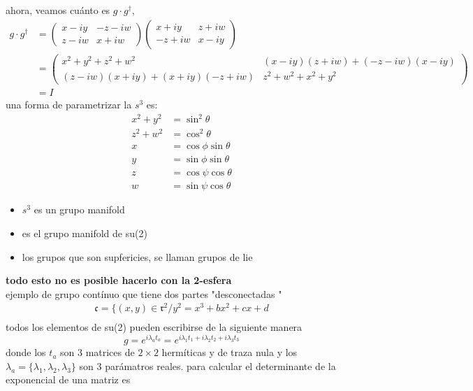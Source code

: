 \documentclass[../main.tex]{subfiles}
\begin{document}
  ahora, veamos cuánto es $g \cdot g^\dagger$, 
\begin{align*}
    g \cdot g^\dagger & = \begin{pmatrix} x-iy & -z-iw \\ z-iw & x+iw \end{pmatrix} \begin{pmatrix} x+iy & z+iw \\ -z + iw & x-iy\end{pmatrix} \\
      & = \begin{pmatrix} x^2 + y^2 + z^2 + w^2 & (x-iy)(z+iw) + (-z-iw)(x-iy) \\
        (z-iw)(x+iy) + (x+iy)(-z+iw) & z^2 + w^2 + x^2 + y^2 
        \end{pmatrix} \\
          & = I
\end{align*}
una forma de parametrizar la $s^3$ es:
\begin{align*}
  x^2 + y^2  & = \sin^2{\theta} \\
  z^2 + w^2 & = \cos^2{\theta} \\
  x & = \cos{\phi}\sin{\theta} \\
  y & = \sin{\phi}\sin{\theta} \\
  z & = \cos{\psi}\cos{\theta} \\
  w & = \sin{\psi}\cos{\theta}
\end{align*}
\begin{itemize}
\item $s^3$ es un grupo manifold 
\item es el grupo manifold de su(2) 
\item los grupos que son supfericies, se llaman grupos de lie
\end{itemize}
        \textbf{todo esto no es posible hacerlo con la 2-esfera}\\
ejemplo de grupo contínuo que tiene dos partes "desconectadas \;"
\begin{align*}
  \mathfrak{c} = \{(x,y)\in\mathfrak{r}^2/ y^2 = x^3 + bx^2 + cx + d\\
\end{align*}
        todos los elementos de su(2) pueden escribirse de la siguiente manera
\begin{equation*}
  g = e^{i\lambda_a t_a} = e^{i\lambda_1 t_1 + i \lambda_2 t_2 + i \lambda_3 t_3}
\end{equation*}
        donde los $t_a$ son 3 matrices de $2\times 2$ hermíticas y de traza nula  y los $\lambda_a = \{\lambda_1 , \lambda_2 , \lambda_3\}$  son 3 parámatros reales. para calcular el determinante de la exponencial de una matriz es
\end{document}
